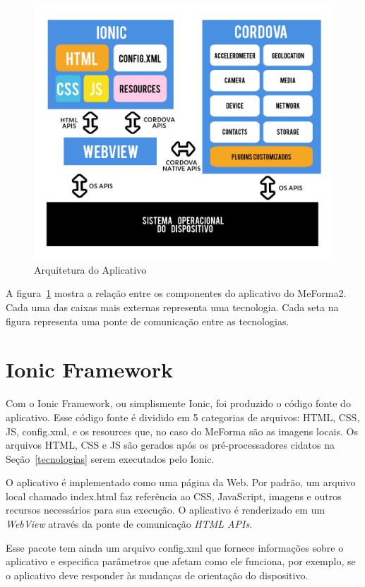 \begin{figure}[H]
	   \centering
	   		\includegraphics[scale=0.28]{pics/c3/0-arquitetura.png}
	   \caption{Arquitetura do Aplicativo}
	   \label{arquitetura}
\end{figure}

A figura~\ref{arquitetura} mostra a relação entre os componentes do aplicativo do MeForma2. Cada uma das caixas mais externas representa uma tecnologia. Cada seta na figura representa uma ponte de comunicação entre as tecnologias.

\section{Ionic Framework}

Com o Ionic Framework, ou simplismente Ionic, foi produzido o código fonte do aplicativo. Esse código fonte é dividido em 5 categorias de arquivos: HTML, CSS, JS, config.xml, e os resources que, no caso do MeForma são as imagens locais. Os arquivos HTML, CSS e JS são gerados após os pré-processadores cidatos na Seção~\ref{tecnologias} serem executados pelo Ionic.

O aplicativo é implementado como uma página da Web. Por padrão, um arquivo local chamado index.html faz referência ao CSS, JavaScript, imagens e outros recursos necessários para sua execução. O aplicativo é renderizado em um \textit{WebView} através da ponte de comunicação \textit{HTML APIs}.

Esse pacote tem ainda um arquivo config.xml que fornece informações sobre o aplicativo e especifica parâmetros que afetam como ele funciona, por exemplo, se o aplicativo deve responder às mudanças de orientação do dispositivo.

